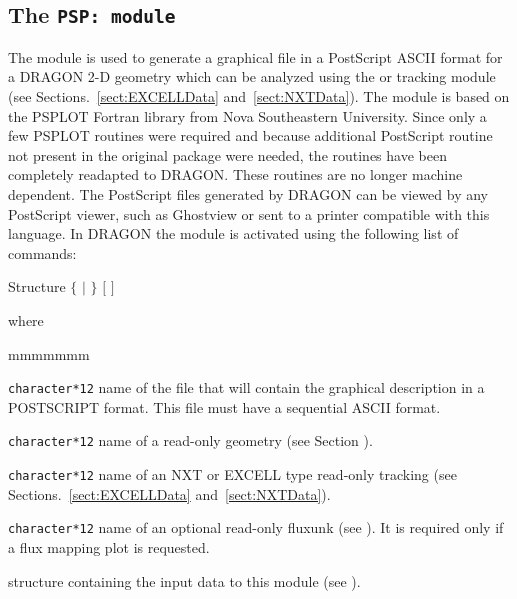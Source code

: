 \subsection{The \tt{PSP:} module}\label{sect:PSPData}

The  module is used to generate a graphical file in a PostScript ASCII format for a DRAGON 2-D
geometry which can be analyzed using the  or  tracking module (see Sections.~\ref{sect:EXCELLData}
and~\ref{sect:NXTData}). The module  
is based on the PSPLOT Fortran library from Nova Southeastern University.\cite{PSPLOT} Since only a few
PSPLOT routines were required and because additional PostScript routine not present in the original package were 
needed, the routines have been completely readapted to DRAGON. These routines are no longer machine dependent.
The PostScript files generated by DRAGON can be viewed by any PostScript viewer, such as Ghostview\cite{GHOSTVIEW}
or sent to a printer compatible with this language. In DRAGON the  module is activated using the following 
list of commands:

\begin{DataStructure}{Structure }
 \moc{:=}   $\{$  $|$  $\}$ $[$  $]$ \moc{::} 
\end{DataStructure}

\noindent  where
\begin{ListeDeDescription}{mmmmmmm}

\item[\dusa{PSGEO}] {\tt character*12} name of the file that will contain the graphical description in a POSTSCRIPT 
format. This file must have a sequential ASCII format. 

\item[\dusa{GEONAM}] {\tt character*12} name of a read-only {\sc geometry} (see Section ). 

\item[\dusa{TRKNAM}] {\tt character*12} name of an NXT or EXCELL type read-only {\sc tracking} (see Sections.~\ref{sect:EXCELLData}
and~\ref{sect:NXTData}).

\item[\dusa{FLUNAM}] {\tt character*12} name of an optional read-only {\sc fluxunk} (see ). It is required only 
if a flux mapping plot is requested. 

\item[\dstr{descpsp}] structure containing the input data to this module (see ).

\end{ListeDeDescription}

